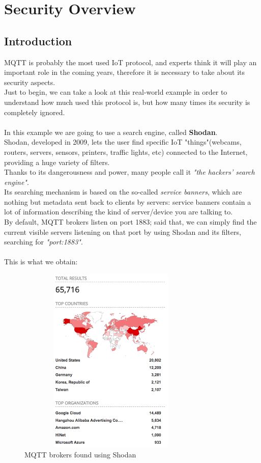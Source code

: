 \documentclass[12pt]{report}
\begin{document}
{\chapter{Security Overview}

\section{Introduction}
\bigskip
MQTT is probably the most used IoT protocol, and experts think it will play an important role in the coming years, therefore it is necessary to take about its security aspects.\\
Just to begin, we can take a look at this real-world example in order to understand how much used this protocol is, but how many times its security is completely ignored.\\\\
In this example we are going to use a search engine, called \textbf{Shodan}.\\
Shodan, developed in 2009, lets the user find specific IoT "things"(webcams, routers, servers, sensors, printers, traffic lights, etc)  connected to the Internet, providing a huge variety of filters.\\

Thanks to its dangerousness and power, many people call it \textit{"the hackers' search engine"}.\\
Its searching mechanism is based on the so-called \textit{service banners}, which are nothing but metadata sent back to clients by servers: service banners contain a lot of information describing the kind of server/device you are talking to.\\

By default, MQTT brokers listen on port 1883; said that, we can simply find the current visible servers listening on that port by using Shodan and its filters, searching for \textit{"port:1883"}.\\\\
This is what we obtain:\\

\begin{figure}[H]
\includegraphics[width=9cm,height=9cm,keepaspectratio]{shodan_numdevices}
\centering
\caption{MQTT brokers found using Shodan}
\end{figure}\

}
\end{document}
